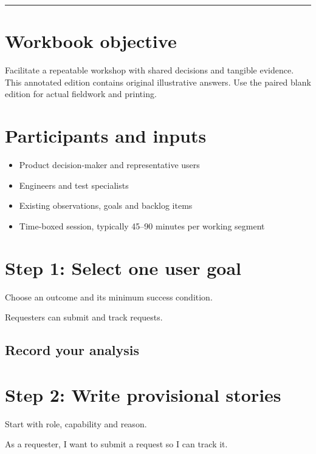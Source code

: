 \documentclass[11pt,letterpaper]{article}
\begin{document}
\tableofcontents\medskip\noindent\rule{\linewidth}{0.4pt}\medskip
\section{Workbook objective}
Facilitate a repeatable workshop with shared decisions and tangible evidence. This annotated edition contains original illustrative answers. Use the paired blank edition for actual fieldwork and printing.

\section{Participants and inputs}
\begin{itemize}[leftmargin=*,itemsep=2pt]
\item Product decision-maker and representative users
\item Engineers and test specialists
\item Existing observations, goals and backlog items
\item Time-boxed session, typically 45–90 minutes per working segment
\end{itemize}
\section{Step 1: Select one user goal}
Choose an outcome and its minimum success condition.

\begin{tcolorbox}[colback=tealback,colframe=navy,title={Illustration},breakable]
Requesters can submit and track requests.

\end{tcolorbox}
\subsection{Record your analysis}
\section{Step 2: Write provisional stories}
Start with role, capability and reason.

\begin{tcolorbox}[colback=tealback,colframe=navy,title={Illustration},breakable]
As a requester, I want to submit a request so I can track it.

\end{tcolorbox}
\end{document}
